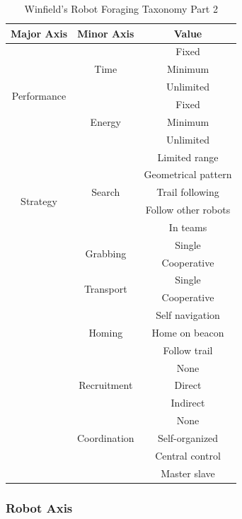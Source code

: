 \begin{table}
\centering
    \caption{Winfield's Robot Foraging Taxonomy Part 2 \cite{winfield2009foraging}}
    \label{foragingtaxonomytable_part2}
    
\begin{tabular}{ | c | c | c |}
\hline
	Major Axis & Minor Axis & Value  \\ \hline
	\multirow{6}{*}{Performance}
		& \multirow{3}{*}{Time} 
			& Fixed \\  
		& 	& Minimum \\ 
		& 	& Unlimited \\ \cline{2-3}
		& \multirow{3}{*}{Energy} 
			& Fixed \\ 
		& 	& Minimum \\ 
		&	& Unlimited \\ \hline
	\multirow{6}{*}{Strategy}	
		& \multirow{5}{*}{Search} 
			& Limited range \\
		&	& Geometrical pattern\\
		&	& Trail following\\
		&	& Follow other robots\\
		&	& In teams\\ \cline{2-3}
		& \multirow{2}{*}{Grabbing} 
			& Single \\
		&	& Cooperative \\ \cline{2-3}
		& \multirow{2}{*}{Transport} 
			& Single \\
		&	& Cooperative \\ \cline{2-3}
		& \multirow{3}{*}{Homing} 
			& Self navigation \\
		&	& Home on beacon \\
		&	& Follow trail \\\cline{2-3}
		& \multirow{3}{*}{Recruitment} 
			& None \\
		&	& Direct \\
		&	& Indirect \\\cline{2-3}
		& \multirow{3}{*}{Coordination} 
			& None \\
		&	& Self-organized \\
		&	&  Central control \\
		&	& Master slave \\\hline
\end{tabular}
\end{table}
\subsubsection{Robot Axis}

